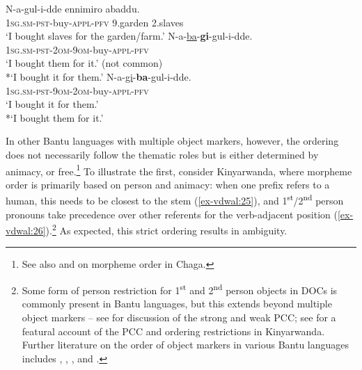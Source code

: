 \documentclass[output=paper
,modfonts
,nonflat]{langsci/langscibook}
\begin{document}
\begin{exe}
\ex \label{ex-vdwal:24}
	\xlist
	\ex
		\gll N-a-gul-i-dde ennimiro abaddu.\\
		\textsc{1sg.sm-pst}-buy-\textsc{appl-pfv} 9.garden 2.slaves\\
		\glt `I bought slaves for the garden/farm.'
	\ex 
		\gll N-a-\underline{ba}-\textbf{gi}-gul-i-dde.\\
		\textsc{1sg.sm-pst-2om-9om}-buy-\textsc{appl-pfv}\\
		\glt `I bought them for it.' (not common)\\
		*`I bought it for them.'
	\ex 	
		\gll N-a-\underline{gi}-\textbf{ba}-gul-i-dde.\\
		\textsc{1sg.sm-pst-9om-2om}-buy-\textsc{appl-pfv}\\
		\glt `I bought it for them.'\\	
		*`I bought them for it.'
	\endxlist
\end{exe}
In other Bantu languages with multiple object markers, however, the ordering does not necessarily follow the thematic roles but is either determined by animacy, or free.\footnote{See also \citet{Bresnan_Moshi1990} and \citet{Alsina1996} on morpheme order in Chaga.} To illustrate the first, consider Kinyarwanda, where morpheme order is primarily based on person and animacy: when one prefix refers to a human, this needs to be closest to the stem (\ref{ex-vdwal:25}), and 1\textsuperscript{st}/2\textsuperscript{nd} person pronouns take precedence over other referents for the verb-adjacent position (\ref{ex-vdwal:26}).\footnote{Some form of person restriction for 1\textsuperscript{st} and 2\textsuperscript{nd} person objects in DOCs is commonly present in Bantu languages, but this extends beyond multiple object markers – see \citet{Riedel2009} for discussion of the strong and weak PCC; see \citet{Yokoyama2016} for a featural account of the PCC and ordering restrictions in Kinyarwanda. Further literature on the order of object markers in various Bantu languages includes \citet{Duranti1979}, \citet{Bresnan_Moshi1990}, \citet{Rugemalira1993}, and \citet{Alsina1996}.} As expected, this strict ordering results in ambiguity.
\end{document}
